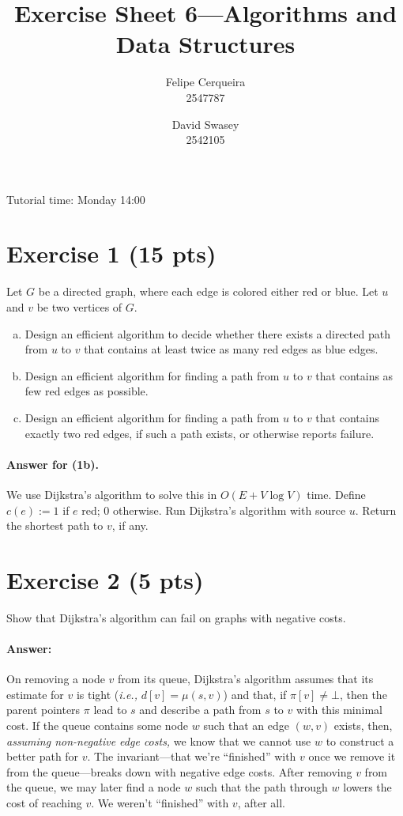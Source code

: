\documentclass[a4paper]{article}
\title{Exercise Sheet 6---Algorithms and Data Structures}
\author{Felipe Cerqueira \\ 2547787 \and David Swasey \\ 2542105}
\newcommand{\ie}{\emph{i.e.,} }
\begin{document}
\maketitle

Tutorial time: Monday 14:00

\section*{Exercise 1 (15 pts)}

Let $G$ be a directed graph, where each edge is colored either red or blue.
Let $u$ and $v$ be two vertices of $G$.
\begin{enumerate}[a)]
	\item Design an efficient algorithm to decide whether there exists a directed path from $u$ to $v$ that contains at least twice as many red edges as blue edges.
	
	\item Design an efficient algorithm for finding a path from $u$ to $v$ that contains as few red edges as possible.
	
	\item Design an efficient algorithm for finding a path from $u$ to $v$ that contains exactly two red edges, if such a path exists, or otherwise reports failure.
\end{enumerate}

\paragraph{Answer for (1b).}
We use Dijkstra's algorithm to solve this in $O(E + V \log V)$ time.
	Define $c(e) := 1$ if $e$ red; $0$ otherwise.
	Run Dijkstra's algorithm with source $u$.
	Return the shortest path to $v$, if any.

\section*{Exercise 2 (5 pts)}

Show that Dijkstra's algorithm can fail on graphs with negative costs.

\paragraph{Answer:}
On removing a node $v$ from its queue, Dijkstra's algorithm assumes that its estimate for $v$ is tight (\ie $d[v] = \mu(s, v)$) and that, if $\pi[v] \not= \bot$, then the parent pointers $\pi$ lead to $s$ and describe a path from $s$ to $v$ with this minimal cost.
If the queue contains some node $w$ such that an edge $(w, v)$ exists, then, \emph{assuming non-negative edge costs,} we know that we cannot use $w$ to construct a better path for $v$.
The invariant---that we're ``finished'' with $v$ once we remove it from the queue---breaks down with negative edge costs.
After removing $v$ from the queue, we may later find a node $w$ such that the path through $w$ lowers the cost of reaching $v$.
We weren't ``finished'' with $v$, after all.
\end{document}
